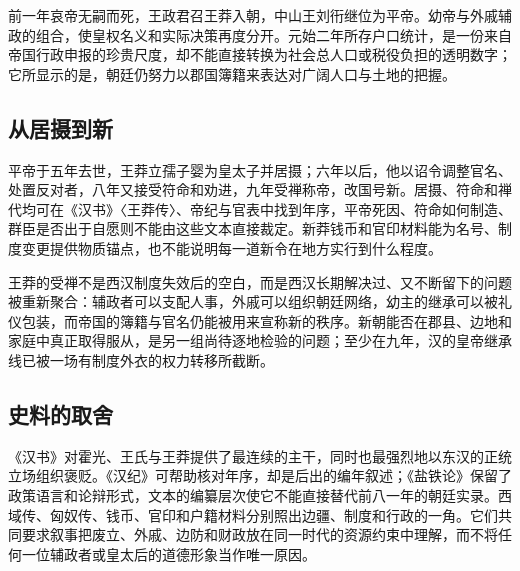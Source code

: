 前一年哀帝无嗣而死，王政君召王莽入朝，中山王刘衎继位为平帝。幼帝与外戚辅政的组合，使皇权名义和实际决策再度分开。元始二年所存户口统计，是一份来自帝国行政申报的珍贵尺度，却不能直接转换为社会总人口或税役负担的透明数字；它所显示的是，朝廷仍努力以郡国簿籍来表达对广阔人口与土地的把握。

\subsection{从居摄到新}

平帝于五年去世，王莽立孺子婴为皇太子并居摄；六年以后，他以诏令调整官名、处置反对者，八年又接受符命和劝进，九年受禅称帝，改国号新。居摄、符命和禅代均可在《汉书》〈王莽传〉、帝纪与官表中找到年序，平帝死因、符命如何制造、群臣是否出于自愿则不能由这些文本直接裁定。新莽钱币和官印材料能为名号、制度变更提供物质锚点，也不能说明每一道新令在地方实行到什么程度。

王莽的受禅不是西汉制度失效后的空白，而是西汉长期解决过、又不断留下的问题被重新聚合：辅政者可以支配人事，外戚可以组织朝廷网络，幼主的继承可以被礼仪包装，而帝国的簿籍与官名仍能被用来宣称新的秩序。新朝能否在郡县、边地和家庭中真正取得服从，是另一组尚待逐地检验的问题；至少在九年，汉的皇帝继承线已被一场有制度外衣的权力转移所截断。

\subsection{史料的取舍}

《汉书》对霍光、王氏与王莽提供了最连续的主干，同时也最强烈地以东汉的正统立场组织褒贬。《汉纪》可帮助核对年序，却是后出的编年叙述；《盐铁论》保留了政策语言和论辩形式，文本的编纂层次使它不能直接替代前八一年的朝廷实录。西域传、匈奴传、钱币、官印和户籍材料分别照出边疆、制度和行政的一角。它们共同要求叙事把废立、外戚、边防和财政放在同一时代的资源约束中理解，而不将任何一位辅政者或皇太后的道德形象当作唯一原因。
